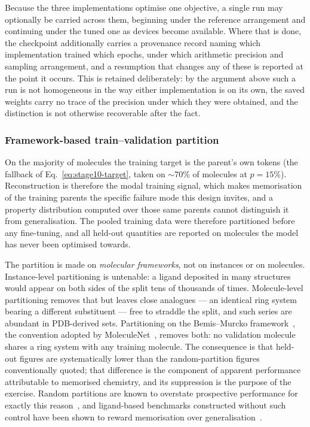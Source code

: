 \documentclass[a4paper,12pt]{article}
\begin{document}
Because the three implementations optimise one objective, a single run may
optionally be carried across them, beginning under the reference arrangement and
continuing under the tuned one as devices become available. Where that is done,
the checkpoint additionally carries a provenance record naming which
implementation trained which epochs, under which arithmetic precision and
sampling arrangement, and a resumption that changes any of these is reported at
the point it occurs. This is retained deliberately: by the argument above such a
run is not homogeneous in the way either implementation is on its own, the saved
weights carry no trace of the precision under which they were obtained, and the
distinction is not otherwise recoverable after the fact.

\subsubsection{Framework-based train--validation partition}

On the majority of molecules the training target is the parent's own tokens (the
fallback of Eq.~\eqref{eq:stage10-target}, taken on $\sim$70\% of molecules at
$p=15\%$). Reconstruction is therefore the modal training signal, which makes
memorisation of the training parents the specific failure mode this design
invites, and a property distribution computed over those same parents cannot
distinguish it from generalisation. The pooled training data were therefore
partitioned before any fine-tuning, and all held-out quantities are reported on
molecules the model has never been optimised towards.

The partition is made on \emph{molecular frameworks}, not on instances or on
molecules. Instance-level partitioning is untenable: a ligand deposited in many
structures would appear on both sides of the split tens of thousands of times.
Molecule-level partitioning removes that but leaves close analogues --- an
identical ring system bearing a different substituent --- free to straddle the
split, and such series are abundant in PDB-derived sets. Partitioning on the
Bemis--Murcko framework~\cite{bemis1996scaffolds}, the convention adopted by
MoleculeNet~\cite{wu2018moleculenet}, removes both: no validation molecule
shares a ring system with any training molecule. The consequence is that
held-out figures are systematically lower than the random-partition figures
conventionally quoted; that difference is the component of apparent performance
attributable to memorised chemistry, and its suppression is the purpose of the
exercise. Random partitions are known to overstate prospective performance for
exactly this reason~\cite{sheridan2013timesplit}, and ligand-based benchmarks
constructed without such control have been shown to reward memorisation over
generalisation~\cite{wallach2018memorization}.
\end{document}
